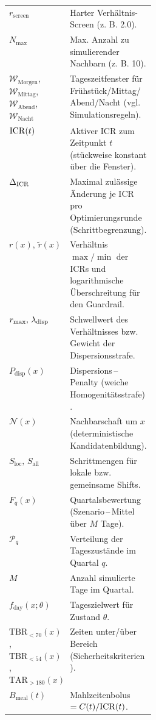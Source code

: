 \begin{table}[p]
\begin{tabularx}{\linewidth}{@{}>{\raggedright\arraybackslash}p{0.28\linewidth}X@{}}
$r_{\text{screen}}$         & Harter Verhältnis-Screen (z. B. 2.0). \\
\(N_{\max}\)                  & Max. Anzahl zu simulierender Nachbarn (z. B. 10). \\
$\mathcal W_{\mathrm{Morgen}}$, $\mathcal W_{\mathrm{Mittag}}$, $\mathcal W_{\mathrm{Abend}}$, $\mathcal W_{\mathrm{Nacht}}$ & Tageszeitfenster f\"ur Fr\"uhst\"uck/Mittag/Abend/Nacht (vgl. Simulationsregeln). \\
$\mathrm{ICR}(t)$                  & Aktiver ICR zum Zeitpunkt $t$ (st\"uckweise konstant \"uber die Fenster). \\
$\Delta_{\mathrm{ICR}}$                    & Maximal zul\"assige \"Anderung je ICR pro Optimierungsrunde (Schrittbegrenzung). \\
$r(x),\,\tilde r(x)$      & Verh\"altnis $\max/\min$ der ICRs und logarithmische \"Uberschreitung f\"ur den Guardrail. \\
$r_{\max},\,\lambda_{\mathrm{disp}}$    & Schwellwert des Verh\"altnisses bzw. Gewicht der Dispersionsstrafe. \\
$P_{\mathrm{disp}}(x)$    & Dispersions\,–\,Penalty (weiche Homogenit\"atsstrafe). \\
$\mathcal N(x)$           & Nachbarschaft um $x$ (deterministische Kandidatenbildung). \\
$S_{\text{loc}},\,S_{\text{all}}$ & Schrittmengen f\"ur lokale bzw. gemeinsame Shifts. \\
$F_q(x)$                  & Quartalsbewertung (Szenario\,–\,Mittel \"uber $M$ Tage). \\
$\mathcal P_q$            & Verteilung der Tageszust\"ande im Quartal $q$. \\
$M$                       & Anzahl simulierte Tage im Quartal. \\
$f_{\text{day}}(x;\theta)$ & Tageszielwert f\"ur Zustand $\theta$. \\
$\mathrm{TBR}_{<70}(x)$, $\mathrm{TBR}_{<54}(x)$, $\mathrm{TAR}_{>180}(x)$ & Zeiten unter/\"uber Bereich (Sicherheitskriterien). \\
$B_{\mathrm{meal}}(t)$   & Mahlzeitenbolus $=C(t)/\mathrm{ICR}(t)$. \\
\hline
\end{tabularx}
\end{table}
\FloatBarrier